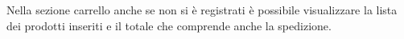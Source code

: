 Nella sezione carrello anche se non si è registrati è possibile visualizzare la lista dei prodotti inseriti e il totale che comprende anche la spedizione.


